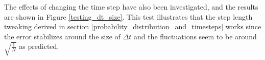 The effects of changing the time step have also been investigated, and the results are shown in Figure \ref{testing_dt_size}. 
This test illustrates that the step length tweaking derived in section \ref{probability_distribution_and_timesteps} works since the error stabilizes around the size of $\Delta t$ and the fluctuations seem to be around $\sqrt{\frac{1}{N}}$ as predicted.\\



